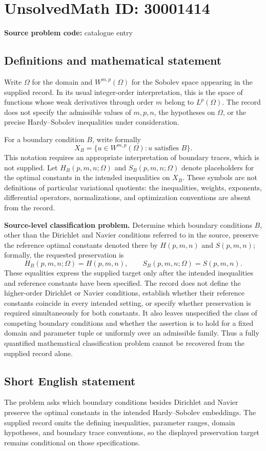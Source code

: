 \documentclass[11pt]{article}
\begin{document}
\section*{UnsolvedMath ID: 30001414}
\textbf{Source problem code:} catalogue entry
\subsection{Definitions and mathematical statement}
Write \(\Omega\) for the domain and \(W^{m,p}(\Omega)\) for the Sobolev space appearing in the supplied record. In its usual integer-order interpretation, this is the space of functions whose weak derivatives through order \(m\) belong to \(L^p(\Omega)\). The record does not specify the admissible values of \(m,p,n\), the hypotheses on \(\Omega\), or the precise Hardy--Sobolev inequalities under consideration.

For a boundary condition \(B\), write formally
\[
X_B=\{u\in W^{m,p}(\Omega):u\text{ satisfies }B\}.
\]
This notation requires an appropriate interpretation of boundary traces, which is not supplied. Let \(H_B(p,m,n;\Omega)\) and \(S_B(p,m,n;\Omega)\) denote placeholders for the optimal constants in the intended inequalities on \(X_B\). These symbols are not definitions of particular variational quotients: the inequalities, weights, exponents, differential operators, normalizations, and optimization conventions are absent from the record.

\textbf{Source-level classification problem.} Determine which boundary conditions \(B\), other than the Dirichlet and Navier conditions referred to in the source, preserve the reference optimal constants denoted there by \(H(p,m,n)\) and \(S(p,m,n)\); formally, the requested preservation is
\[
H_B(p,m,n;\Omega)=H(p,m,n),\qquad
S_B(p,m,n;\Omega)=S(p,m,n).
\]
These equalities express the supplied target only after the intended inequalities and reference constants have been specified. The record does not define the higher-order Dirichlet or Navier conditions, establish whether their reference constants coincide in every intended setting, or specify whether preservation is required simultaneously for both constants. It also leaves unspecified the class of competing boundary conditions and whether the assertion is to hold for a fixed domain and parameter tuple or uniformly over an admissible family. Thus a fully quantified mathematical classification problem cannot be recovered from the supplied record alone.
\subsection{Short English statement}
The problem asks which boundary conditions besides Dirichlet and Navier preserve the optimal constants in the intended Hardy--Sobolev embeddings. The supplied record omits the defining inequalities, parameter ranges, domain hypotheses, and boundary trace conventions, so the displayed preservation target remains conditional on those specifications.
\end{document}
